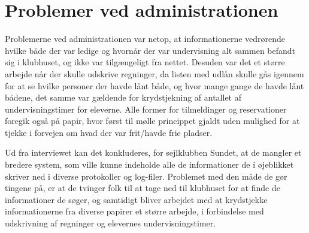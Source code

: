 \section*{Problemer ved administrationen}
Problemerne ved administrationen var netop, at informationerne vedrørende hvilke både der var ledige og hvornår der var undervisning alt sammen befandt sig i klubhuset, og ikke var tilgængeligt fra nettet. Desuden var det et større arbejde når der skulle udskrive regninger, da listen med udlån skulle gås igennem for at se hvilke personer der havde lånt både, og hvor mange gange de havde lånt bådene,  det samme var gældende for krydstjekning af antallet af undervisningstimer for eleverne. Alle former for tilmeldinger og reservationer foregik også på papir, hvor først til mølle princippet gjaldt uden mulighed for at tjekke i forvejen om hvad der var frit/havde frie pladser.

Ud fra interviewet kan det konkluderes, for sejlklubben Sundet, at de mangler et bredere system, som ville kunne indeholde alle de informationer de i øjeblikket skriver ned i diverse protokoller og log-filer. Problemet med den måde de gør tingene på, er at de tvinger folk til at tage ned til klubhuset for at finde de informationer de søger, og samtidigt bliver arbejdet med at krydstjekke informationerne fra diverse papirer et større arbejde, i forbindelse med udskrivning af regninger og elevernes undervisningstimer.  